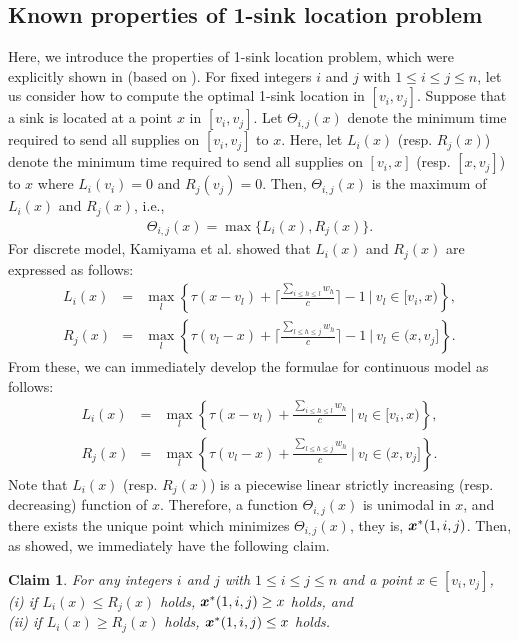 \documentclass[a4paper]{llncs}
\newcommand{\bm}[1]{\mbox{\boldmath{$#1$}}}
\newtheorem{clm}{Claim}
\begin{document}
\subsection{Known properties of 1-sink location problem}
Here, we introduce the properties of 1-sink location problem, which were explicitly shown in \cite{hgk14_2} (based on \cite{chknsx13,hacgknsx14}). 
For fixed integers $i$ and $j$ with $1 \le i \le j \le n$, let us consider how to compute the optimal 1-sink location in $[v_i, v_j]$.
Suppose that a sink is located at a point $x$ in $[v_i, v_j]$.
Let $\Theta_{i, j}(x)$ denote the minimum time required to send all supplies on $[v_i, v_j]$ to $x$.
Here, let $L_i(x)$ (resp. $R_j(x)$) denote the minimum time required to send all supplies on $[v_i, x]$ (resp. $[x, v_j]$) to $x$ where $L_i(v_i) = 0$ and $R_j(v_j) = 0$.
Then, $\Theta_{i, j}(x)$ is the maximum of $L_i(x)$ and $R_j(x)$,
i.e., 
\begin{eqnarray}
\Theta_{i, j}(x) = \max \{ L_i(x), R_j(x) \}. \label{eq4}
\end{eqnarray}
For discrete model, Kamiyama et al. \cite{kkt06} showed that
$L_i(x)$ and $R_j(x)$ are expressed as follows:
\begin{eqnarray*}
L_i(x) &=& \max_l \left\{ \tau(x - v_l) + \bigg\lceil \frac{\sum_{i \le h \le l} w_h}{c} \bigg\rceil - 1 \ \bigg| \ v_l \in [v_i, x) \right\},  \\
R_j(x) &=& \max_l \left\{ \tau(v_l - x) + \bigg\lceil \frac{\sum_{l \le h \le j} w_h}{c} \bigg\rceil - 1 \ \bigg| \ v_l \in (x, v_j] \right\}.
\end{eqnarray*}
From these, we can immediately develop the formulae for continuous model as follows:
\begin{eqnarray}
L_i(x) &=& \max_l \left\{ \tau(x - v_l) + \frac{\sum_{i \le h \le l} w_h}{c} \ \bigg| \ v_l \in [v_i, x) \right\}, \label{eq3.1} \\
R_j(x) &=& \max_l \left\{ \tau(v_l - x) + \frac{\sum_{l \le h \le j} w_h}{c} \ \bigg| \ v_l \in (x, v_j] \right\}. \label{eq3.2}
\end{eqnarray}
Note that $L_i(x)$ (resp. $R_j(x)$) is a piecewise linear strictly increasing (resp. decreasing) function of $x$.
Therefore, a function $\Theta_{i, j}(x)$ is unimodal in $x$, and there exists the unique point which minimizes $\Theta_{i, j}(x)$, they is, ${\bm x}^*(1, i, j)$.
Then, as \cite{chknsx13,hacgknsx14,hgk14_2} showed, we immediately have the following claim.
\begin{clm}
For any integers $i$ and $j$ with $1 \le i \le j \le n$ and a point $x \in [v_i, v_j]$, \\
{\rm (i)} if $L_i(x) \le R_j(x)$ holds, ${\bm x}^*(1, i, j) \ge x$ holds, and \\
{\rm (ii)} if $L_i(x) \ge R_j(x)$ holds, ${\bm x}^*(1, i, j) \le x$ holds.
\label{clm2}
\end{clm}
\end{document}
